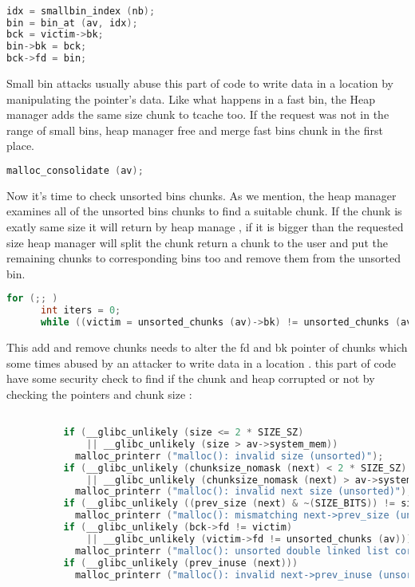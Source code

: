 \documentclass{masterthesis}
\begin{document}
\begin{lstlisting}[language=c]

idx = smallbin_index (nb);
bin = bin_at (av, idx);
bck = victim->bk;
bin->bk = bck;
bck->fd = bin;
\end{lstlisting}

Small bin attacks usually abuse this part of code to write data in a location by manipulating the pointer's data. Like what happens in a fast bin, the Heap manager adds the same size chunk to tcache too. If the request was not in the range of small bins, heap manager free and merge fast bins chunk in the first place.
\begin{lstlisting}[language=c]
malloc_consolidate (av);
\end{lstlisting}

Now it's time to check unsorted bins chunks. As we mention, the heap manager examines all of the unsorted bins chunks to find a suitable chunk. If the chunk is exatly same size it will return by heap manage , if it is bigger than the requested size heap manager will split the chunk return a chunk to the user and put the remaining chunks to corresponding bins too and remove them from the unsorted bin.
\begin{lstlisting}[language=c]
for (;; )   
      int iters = 0;
      while ((victim = unsorted_chunks (av)->bk) != unsorted_chunks (av))
\end{lstlisting}
This add and remove chunks needs to alter the fd and bk pointer of chunks which some times abused by an attacker to write data in a location . this part of code have some security check to find if the chunk and heap corrupted or not by checking the pointers and chunk size :
\begin{lstlisting}[language=c]

          if (__glibc_unlikely (size <= 2 * SIZE_SZ)
              || __glibc_unlikely (size > av->system_mem))
            malloc_printerr ("malloc(): invalid size (unsorted)");
          if (__glibc_unlikely (chunksize_nomask (next) < 2 * SIZE_SZ)
              || __glibc_unlikely (chunksize_nomask (next) > av->system_mem))
            malloc_printerr ("malloc(): invalid next size (unsorted)");
          if (__glibc_unlikely ((prev_size (next) & ~(SIZE_BITS)) != size))
            malloc_printerr ("malloc(): mismatching next->prev_size (unsorted)");
          if (__glibc_unlikely (bck->fd != victim)
              || __glibc_unlikely (victim->fd != unsorted_chunks (av)))
            malloc_printerr ("malloc(): unsorted double linked list corrupted");
          if (__glibc_unlikely (prev_inuse (next)))
            malloc_printerr ("malloc(): invalid next->prev_inuse (unsorted)");
\end{lstlisting}
\end{document}
